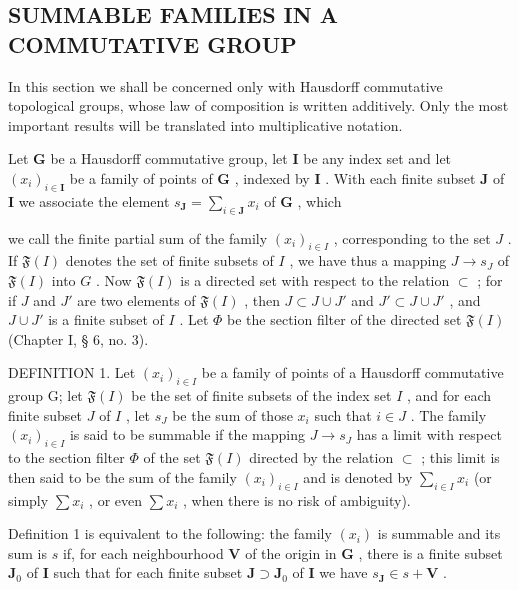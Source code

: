 \subsection{SUMMABLE FAMILIES IN A COMMUTATIVE GROUP}

In this section we shall be concerned only with Hausdorff commutative topological groups, whose law of composition is written additively. Only the most important results will be translated into multiplicative notation.

Let \(\mathbf{G}\) be a Hausdorff commutative group, let \(\mathbf{I}\) be any index set and let \((x_{i})_{i\in \mathbf{I}}\) be a family of points of \(\mathbf{G}\) , indexed by \(\mathbf{I}\) . With each finite subset \(\mathbf{J}\) of \(\mathbf{I}\) we associate the element \(s_{\mathbf{J}} = \sum_{i\in \mathbf{J}}x_i\) of \(\mathbf{G}\) , which

we call the finite partial sum of the family \((x_{i})_{i\in I}\) , corresponding to the set \(J\) . If \(\mathfrak{F}(I)\) denotes the set of finite subsets of \(I\) , we have thus a mapping \(J\to s_J\) of \(\mathfrak{F}(I)\) into \(G\) . Now \(\mathfrak{F}(I)\) is a directed set with respect to the relation \(\subset\) ; for if \(J\) and \(J'\) are two elements of \(\mathfrak{F}(I)\) , then \(J\subset J\cup J'\) and \(J'\subset J\cup J'\) , and \(J\cup J'\) is a finite subset of \(I\) . Let \(\Phi\) be the section filter of the directed set \(\mathfrak{F}(I)\) (Chapter I, § 6, no. 3).

DEFINITION 1. Let \((x_{i})_{i\in I}\) be a family of points of a Hausdorff commutative group G; let \(\mathfrak{F}(I)\) be the set of finite subsets of the index set \(I\) , and for each finite subset \(J\) of \(I\) , let \(s_J\) be the sum of those \(x_{i}\) such that \(i\in J\) . The family \((x_{i})_{i\in I}\) is said to be summable if the mapping \(J\to s_J\) has a limit with respect to the section filter \(\Phi\) of the set \(\mathfrak{F}(I)\) directed by the relation \(\subset\) ; this limit is then said to be the sum of the family \((x_{i})_{i\in I}\) and is denoted by \(\sum_{i\in I}x_{i}\) (or simply \(\sum x_{i}\) , or even \(\sum x_{i}\) , when there is no risk of ambiguity).

Definition 1 is equivalent to the following: the family \((x_{i})\) is summable and its sum is \(s\) if, for each neighbourhood \(\mathbf{V}\) of the origin in \(\mathbf{G}\) , there is a finite subset \(\mathbf{J}_0\) of \(\mathbf{I}\) such that for each finite subset \(\mathbf{J} \supset \mathbf{J}_0\) of \(\mathbf{I}\) we have \(s_{\mathbf{J}} \in s + \mathbf{V}\) .

